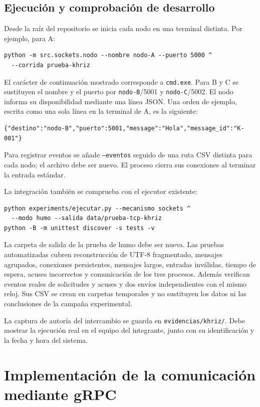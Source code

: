 \documentclass[11pt,a4paper]{article}
\begin{document}
\subsection{Ejecución y comprobación de desarrollo}

Desde la raíz del repositorio se inicia cada nodo en una terminal distinta.
Por ejemplo, para A:

\begin{verbatim}
python -m src.sockets.nodo --nombre nodo-A --puerto 5000 ^
  --corrida prueba-khriz
\end{verbatim}

El carácter de continuación mostrado corresponde a \texttt{cmd.exe}.
Para B y C se sustituyen el nombre y el puerto por \texttt{nodo-B}/5001 y
\texttt{nodo-C}/5002. El nodo informa su disponibilidad mediante una línea
JSON. Una orden de ejemplo, escrita como una sola línea en la terminal de A,
es la siguiente:

\begin{verbatim}
{"destino":"nodo-B","puerto":5001,"message":"Hola","message_id":"K-001"}
\end{verbatim}

Para registrar eventos se añade \texttt{--eventos} seguido de una
ruta CSV distinta para cada nodo; el archivo debe ser nuevo. El proceso
cierra sus conexiones al terminar la entrada estándar.

La integración también se comprueba con el ejecutor existente:

\begin{verbatim}
python experiments/ejecutar.py --mecanismo sockets ^
  --modo humo --salida data/prueba-tcp-khriz
python -B -m unittest discover -s tests -v
\end{verbatim}

La carpeta de salida de la prueba de humo debe ser nueva. Las pruebas
automatizadas cubren reconstrucción de UTF-8 fragmentado, mensajes
agrupados, conexiones persistentes, mensajes largos, entradas inválidas,
tiempo de espera, acuses incorrectos y comunicación de los tres procesos.
Además verifican eventos reales de solicitudes y acuses y dos envíos
independientes con el mismo reloj. Sus CSV se crean en carpetas temporales
y no sustituyen los datos ni las conclusiones de la campaña experimental.

La captura de autoría del intercambio se guarda en
\texttt{evidencias/khriz/}. Debe mostrar la ejecución real en el equipo
del integrante, junto con su identificación y la fecha y hora del sistema.
\section{Implementación de la comunicación mediante gRPC}
\label{sec:grpc}
\end{document}
